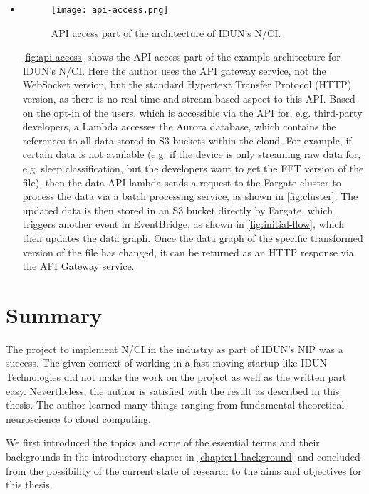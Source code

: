 \begin{itemize}
  \item \begin{figure}[!ht]
          \centering
          \hspace*{0.4in}
          \texttt{[image: api-access.png]}
          \caption{API access part of the architecture of IDUN's N/CI.}
          \label{fig:api-access}
        \end{figure}

        \autoref{fig:api-access} shows the API access part of the example architecture for IDUN's N/CI. Here the author uses the API gateway service, not the WebSocket version, but the standard Hypertext Transfer Protocol (HTTP) version, as there is no real-time and stream-based aspect to this API. Based on the opt-in of the users, which is accessible via the API for, e.g. third-party developers, a Lambda accesses the Aurora database, which contains the references to all data stored in S3 buckets within the cloud. For example, if certain data is not available (e.g. if the device is only streaming raw data for, e.g. sleep classification, but the developers want to get the FFT version of the file), then the data API lambda sends a request to the Fargate cluster to process the data via a batch processing service, as shown in \autoref{fig:cluster}. The updated data is then stored in an S3 bucket directly by Fargate, which triggers another event in EventBridge, as shown in \autoref{fig:initial-flow}, which then updates the data graph. Once the data graph of the specific transformed version of the file has changed, it can be returned as an HTTP response via the API Gateway service.

\end{itemize}

\newpage

\section{Summary}
\label{chapter5-summary}

The project to implement N/CI in the industry as part of IDUN's NIP was a success. The given context of working in a fast-moving startup like IDUN Technologies did not make the work on the project as well as the written part easy. Nevertheless, the author is satisfied with the result as described in this thesis. The author learned many things ranging from fundamental theoretical neuroscience to cloud computing.

We first introduced the topics and some of the essential terms and their backgrounds in the introductory chapter in \autoref{chapter1-background} and concluded from the possibility of the current state of research to the aims and objectives for this thesis.

